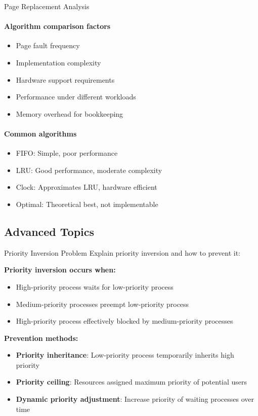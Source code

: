 \begin{KR}{Page Replacement Analysis}
    \paragraph{Algorithm comparison factors}
    \begin{itemize}
        \item Page fault frequency
        \item Implementation complexity
        \item Hardware support requirements
        \item Performance under different workloads
        \item Memory overhead for bookkeeping
    \end{itemize}
    
    \paragraph{Common algorithms}
    \begin{itemize}
        \item FIFO: Simple, poor performance
        \item LRU: Good performance, moderate complexity
        \item Clock: Approximates LRU, hardware efficient
        \item Optimal: Theoretical best, not implementable
    \end{itemize}
\end{KR}

\subsection{Advanced Topics}

\begin{example2}{Priority Inversion Problem}
    Explain priority inversion and how to prevent it:
    
    \tcblower
    
    \textbf{Priority inversion occurs when:}
    \begin{itemize}
        \item High-priority process waits for low-priority process
        \item Medium-priority processes preempt low-priority process
        \item High-priority process effectively blocked by medium-priority processes
    \end{itemize}
    
    \textbf{Prevention methods:}
    \begin{itemize}
        \item \textbf{Priority inheritance}: Low-priority process temporarily inherits high priority
        \item \textbf{Priority ceiling}: Resources assigned maximum priority of potential users
        \item \textbf{Dynamic priority adjustment}: Increase priority of waiting processes over time
    \end{itemize}
\end{example2}

